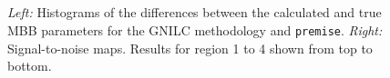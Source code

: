\documentclass[a4paper,fleqn,usenatbib]{mnras}
\begin{document}
\begin{figure}
\centering
{} 
 \\
\\
\\
\\
\caption{{\it{Left:}} Histograms of the differences between the calculated and true MBB parameters for the GNILC methodology and {\texttt{premise}}. {\it{Right:}} Signal-to-noise maps. Results for region 1 to 4 shown from top to bottom.}
\label{fig:histAll}
\end{figure}
\end{document}
